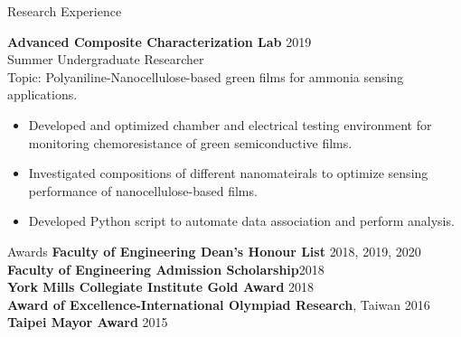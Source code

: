 \documentclass{my_resume} %
\begin{document}
\begin{minipage}[t]{0.66\textwidth}


    \begin{rSection}{Research Experience}
    
        {\bf Advanced Composite Characterization Lab}     \hfill{2019}\\
        Summer Undergraduate Researcher\\
        Topic: Polyaniline-Nanocellulose-based green films for ammonia sensing applications. 
        \begin{itemize}
            \item Developed and optimized chamber and electrical testing environment for monitoring chemoresistance of green semiconductive films. 
            \item Investigated compositions of different nanomateirals to optimize sensing performance of nanocellulose-based films.
            \item Developed Python script to automate data association and perform analysis.
        \end{itemize}


    \end{rSection}

        

    \begin{rSection}{Awards}
        {\bf Faculty of Engineering Dean's Honour List} \hfill{2018, 2019, 2020} \\
        {\bf Faculty of Engineering Admission Scholarship}\hfill{2018} \\
        {\bf York Mills Collegiate Institute Gold Award}  \hfill{2018}\\ 
        {\bf Award of Excellence-International Olympiad Research}, Taiwan \hfill{2016} \\
        {\bf Taipei Mayor Award} \hfill{2015}
    \end{rSection}




\end{minipage}
\end{document}
